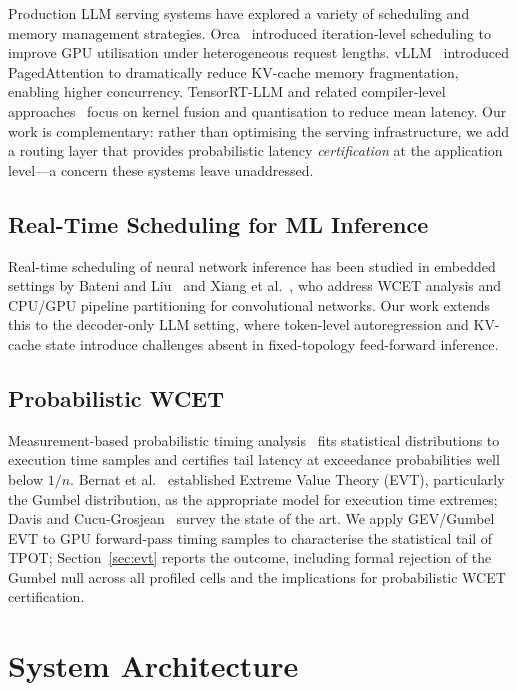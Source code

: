 \documentclass[conference]{IEEEtran}
\begin{document}
Production LLM serving systems have explored a variety of scheduling and
memory management strategies.
Orca~\cite{yu2022orca} introduced iteration-level scheduling to improve
GPU utilisation under heterogeneous request lengths.
vLLM~\cite{kwon2023efficient} introduced PagedAttention to dramatically
reduce KV-cache memory fragmentation, enabling higher concurrency.
TensorRT-LLM and related compiler-level approaches~\cite{dao2022flashattention}
focus on kernel fusion and quantisation to reduce mean latency.
Our work is complementary: rather than optimising the serving infrastructure,
we add a routing layer that provides probabilistic latency \emph{certification}
at the application level---a concern these systems leave unaddressed.

\subsection{Real-Time Scheduling for ML Inference}

Real-time scheduling of neural network inference has been studied in
embedded settings by Bateni and Liu~\cite{bateni2020neuos} and
Xiang et al.~\cite{xiang2019pipelined}, who address WCET analysis and
CPU/GPU pipeline partitioning for convolutional networks.
Our work extends this to the decoder-only LLM setting,
where token-level autoregression and KV-cache state introduce
challenges absent in fixed-topology feed-forward inference.

\subsection{Probabilistic WCET}

Measurement-based probabilistic timing analysis~\cite{cucu2012measurement}
fits statistical distributions to execution time samples and certifies
tail latency at exceedance probabilities well below $1/n$.
Bernat et al.~\cite{bernat2002wcet} established Extreme Value Theory
(EVT), particularly the Gumbel distribution, as the appropriate model
for execution time extremes; Davis and Cucu-Grosjean~\cite{davis2013quantifying}
survey the state of the art.
We apply GEV/Gumbel EVT to GPU forward-pass timing samples to characterise
the statistical tail of TPOT; Section~\ref{sec:evt} reports the outcome,
including formal rejection of the Gumbel null across all profiled cells
and the implications for probabilistic WCET certification.

\section{System Architecture}
\end{document}
